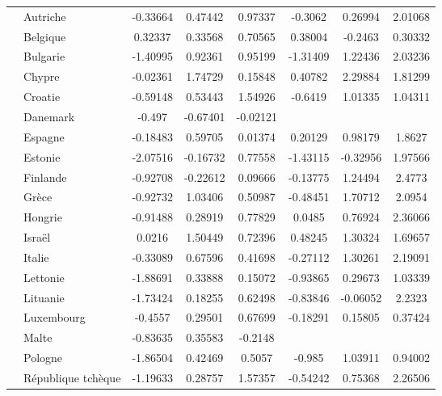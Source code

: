 \begin{Article}
\begin{refsection}[Bonnal]
\begin{table}
{\begin{threeparttable}
\begin{tabular}{l@{}l@{} S!{\qquad}S!{\qquad}S!{\quad} |S!{\qquad}S!{\qquad}S!{\quad}}
	& Autriche & -0.33664\sym{**} & 0.47442\sym{***} & 0.97337\sym{***} & -0.3062 & 0.26994 & 2.01068\sym{***}\\
	& Belgique & 0.32337\sym{***} & 0.33568\sym{***} & 0.70565\sym{***} & 0.38004\sym{**} & -0.2463 & 0.30332\\
	& Bulgarie & -1.40995\sym{***} & 0.92361\sym{**} & 0.95199\sym{***} & -1.31409\sym{***} & 1.22436 & 2.03236\sym{***}\\
	& Chypre & -0.02361 & 1.74729\sym{***} & 0.15848 & 0.40782 & 2.29884\sym{***} & 1.81299\sym{***}\\
	& Croatie & -0.59148\sym{**} & 0.53443\sym{*} & 1.54926\sym{***} & -0.6419 & 1.01335 & 1.04311\\
	& Danemark & -0.497\sym{***} & -0.67401\sym{***} & -0.02121 &&&\\
	& Espagne & -0.18483 & 0.59705\sym{***} & 0.01374 & 0.20129 & 0.98179\sym{***} & 1.8627\sym{***}\\
	& Estonie & -2.07516\sym{***} & -0.16732 & 0.77558\sym{***} & -1.43115\sym{***} & -0.32956 & 1.97566\sym{***}\\
	& Finlande & -0.92708\sym{***} & -0.22612 & 0.09666 & -0.13775 & 1.24494\sym{**} & 2.4773\sym{***}\\
	& Grèce & -0.92732\sym{***} & 1.03406\sym{***} & 0.50987\sym{**} & -0.48451\sym{*} & 1.70712\sym{***} & 2.0954\sym{***}\\
	& Hongrie & -0.91488\sym{***} & 0.28919 & 0.77829\sym{**} & 0.0485 & 0.76924\sym{*} & 2.36066\sym{***}\\
	& Israël & 0.0216 & 1.50449\sym{***} & 0.72396\sym{*} & 0.48245\sym{*} & 1.30324\sym{***} & 1.69657\sym{**}\\
	& Italie & -0.33089\sym{**} & 0.67596\sym{***} & 0.41698 & -0.27112 & 1.30261\sym{***} & 2.19091\sym{***}\\
	& Lettonie & -1.88691\sym{***} & 0.33888 & 0.15072 & -0.93865\sym{**} & 0.29673 & 1.03339\\
	& Lituanie & -1.73424\sym{***} & 0.18255 & 0.62498\sym{**} & -0.83846\sym{***} & -0.06052 & 2.2323\sym{***}\\
	& Luxembourg & -0.4557\sym{**} & 0.29501 & 0.67699\sym{*} & -0.18291 & 0.15805 & 0.37424\\
	& Malte & -0.83635\sym{**} & 0.35583 & -0.2148 &&&\\
	& Pologne & -1.86504\sym{***} & 0.42469 & 0.5057\sym{*} & -0.985\sym{***} & 1.03911\sym{*} & 0.94002\\
	& République tchèque & -1.19633\sym{***} & 0.28757 & 1.57357\sym{***} & -0.54242\sym{**} & 0.75368\sym{**} & 2.26506\sym{***}\\

\end{tabular}
\end{threeparttable}}
\end{table}
\end{refsection}
\end{Article}
